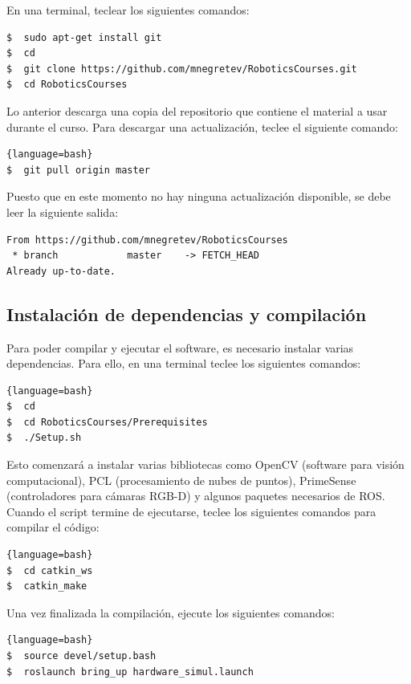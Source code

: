 \documentclass[letterpaper,12pt]{article}
\begin{document}
En una terminal, teclear los siguientes comandos:

\begin{lstlisting}[language=bash]
$  sudo apt-get install git
$  cd
$  git clone https://github.com/mnegretev/RoboticsCourses.git
$  cd RoboticsCourses
\end{lstlisting}

Lo anterior descarga una copia del repositorio que contiene el material a usar durante el curso. Para descargar una actualización, teclee el siguiente comando:

\begin{lstlisting}{language=bash}
$  git pull origin master
\end{lstlisting}

Puesto que en este momento no hay ninguna actualización disponible, se debe leer la siguiente salida:

\begin{verbatim}
From https://github.com/mnegretev/RoboticsCourses
 * branch            master    -> FETCH_HEAD
Already up-to-date.
\end{verbatim}

\subsection{Instalación de dependencias y compilación}
Para poder compilar y ejecutar el software, es necesario instalar varias dependencias. Para ello, en una terminal teclee los siguientes comandos:

\begin{lstlisting}{language=bash}
$  cd
$  cd RoboticsCourses/Prerequisites
$  ./Setup.sh
\end{lstlisting}

Esto comenzará a instalar varias bibliotecas como OpenCV (software para visión computacional), PCL (procesamiento de nubes de puntos), PrimeSense (controladores para cámaras RGB-D) y algunos paquetes necesarios de ROS. Cuando el script termine de ejecutarse, teclee los siguientes comandos para compilar el código:

\begin{lstlisting}{language=bash}
$  cd catkin_ws
$  catkin_make
\end{lstlisting}

Una vez finalizada la compilación, ejecute los siguientes comandos:

\begin{lstlisting}{language=bash}
$  source devel/setup.bash
$  roslaunch bring_up hardware_simul.launch
\end{lstlisting}
\end{document}
